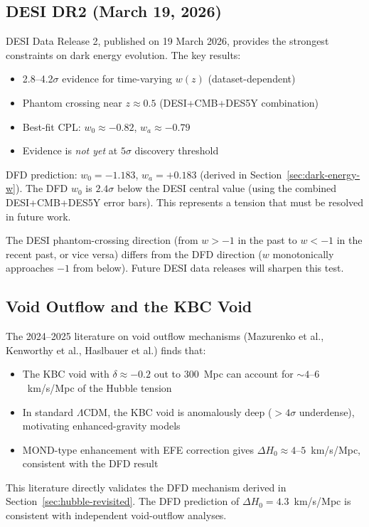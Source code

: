 \documentclass[11pt]{article}
\theoremstyle{definition}
\theoremstyle{remark}
\begin{document}
\subsection{DESI DR2 (March 19, 2026)}

DESI Data Release 2, published on 19 March 2026, provides the strongest
constraints on dark energy evolution. The key results:
\begin{itemize}
\item 2.8--4.2$\sigma$ evidence for time-varying $w(z)$ (dataset-dependent)
\item Phantom crossing near $z \approx 0.5$ (DESI+CMB+DES5Y combination)
\item Best-fit CPL: $w_0 \approx -0.82$, $w_a \approx -0.79$
\item Evidence is \emph{not yet} at $5\sigma$ discovery threshold
\end{itemize}

DFD prediction: $w_0 = -1.183$, $w_a = +0.183$ (derived in
Section~\ref{sec:dark-energy-w}). The DFD $w_0$ is $2.4\sigma$ below
the DESI central value (using the combined DESI+CMB+DES5Y error bars).
This represents a tension that must be resolved in future work.

The DESI phantom-crossing direction (from $w > -1$ in the past to
$w < -1$ in the recent past, or vice versa) differs from the DFD
direction ($w$ monotonically approaches $-1$ from below). Future DESI
data releases will sharpen this test.

\subsection{Void Outflow and the KBC Void}

The 2024--2025 literature on void outflow mechanisms (Mazurenko et al.,
Kenworthy et al., Haslbauer et al.) finds that:
\begin{itemize}
\item The KBC void with $\delta \approx -0.2$ out to 300~Mpc can
  account for $\sim 4$--$6$~km/s/Mpc of the Hubble tension
\item In standard $\Lambda$CDM, the KBC void is anomalously deep
  ($> 4\sigma$ underdense), motivating enhanced-gravity models
\item MOND-type enhancement with EFE correction gives
  $\Delta H_0 \approx 4$--$5$~km/s/Mpc, consistent with the DFD result
\end{itemize}

This literature directly validates the DFD mechanism derived in
Section~\ref{sec:hubble-revisited}. The DFD prediction of
$\Delta H_0 = 4.3$~km/s/Mpc is consistent with independent void-outflow
analyses.
\end{document}
